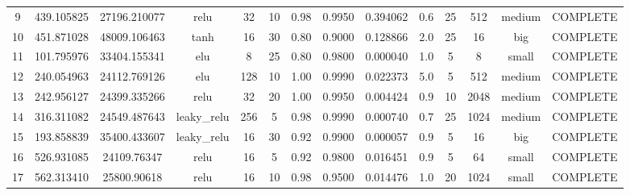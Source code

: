\begin{longtable}{cccccccccccccc}
                        9 &                 439.105825 &                       27196.210077 &            relu &          32 &             10 &        0.98 & 0.9950 &       0.394062 &             0.6 &                 25 &      512 &    medium & COMPLETE \\
                       10 &                 451.871028 &                       48009.106463 &            tanh &          16 &             30 &        0.80 & 0.9000 &       0.128866 &             2.0 &                 25 &       16 &       big & COMPLETE \\
                       11 &                 101.795976 &                       33404.155341 &             elu &           8 &             25 &        0.80 & 0.9800 &       0.000040 &             1.0 &                  5 &        8 &     small & COMPLETE \\
                       12 &                 240.054963 &                       24112.769126 &             elu &         128 &             10 &        1.00 & 0.9990 &       0.022373 &             5.0 &                  5 &      512 &    medium & COMPLETE \\
                       13 &                 242.956127 &                       24399.335266 &            relu &          32 &             20 &        1.00 & 0.9950 &       0.004424 &             0.9 &                 10 &     2048 &    medium & COMPLETE \\
                       14 &                 316.311082 &                       24549.487643 &     leaky\_relu &         256 &              5 &        0.98 & 0.9990 &       0.000740 &             0.7 &                 25 &     1024 &    medium & COMPLETE \\
                       15 &                 193.858839 &                       35400.433607 &     leaky\_relu &          16 &             30 &        0.92 & 0.9900 &       0.000057 &             0.9 &                  5 &       16 &       big & COMPLETE \\
                       16 &                 526.931085 &                        24109.76347 &            relu &          16 &              5 &        0.92 & 0.9800 &       0.016451 &             0.9 &                  5 &       64 &     small & COMPLETE \\
                       17 &                 562.313410 &                        25800.90618 &            relu &          16 &             10 &        0.98 & 0.9500 &       0.014476 &             1.0 &                 20 &     1024 &     small & COMPLETE \\

\end{longtable}

